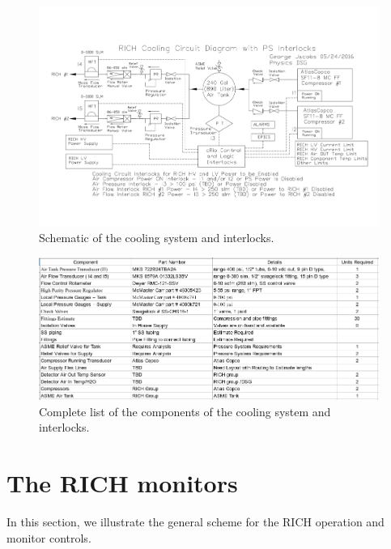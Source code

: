 \documentclass[12pt]{article}
\begin{document}
\begin{figure}[h!]
\center
\includegraphics[width=0.99\textwidth]{pics/Cooling_interlocks.jpg}
\caption{ \label{fig:Cooling_interlocks} Schematic of the cooling system and interlocks.}
\end{figure}

\begin{figure}[h!]
\center
\includegraphics[width=0.99\textwidth]{pics/Cooling_components.jpg}
\caption{ \label{fig:Cooling_components} Complete list of the components of the cooling system and interlocks.}
\end{figure}



{\color{blue}
\section{The RICH monitors}
}

In this section, we illustrate the general scheme for the RICH operation and monitor controls.
\end{document}
